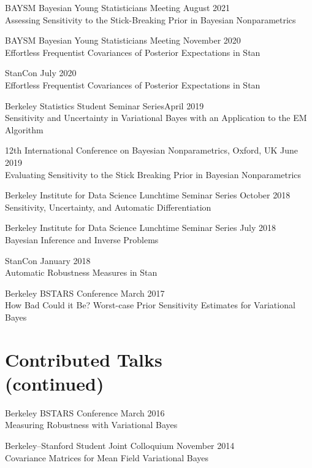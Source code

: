 \documentclass[margin,line]{res}
\begin{document}
\begin{resume}
BAYSM Bayesian Young Statisticians Meeting
\hfill August 2021\\
Assessing Sensitivity to the Stick-Breaking Prior in Bayesian Nonparametrics

BAYSM Bayesian Young Statisticians Meeting
\hfill November 2020\\
Effortless Frequentist Covariances of Posterior Expectations in Stan

StanCon \hfill July 2020\\
Effortless Frequentist Covariances of Posterior Expectations in Stan

Berkeley Statistics Student Seminar Series\hfill April 2019\\
Sensitivity and Uncertainty in Variational Bayes with an Application to the
EM Algorithm

12th International Conference on Bayesian Nonparametrics, Oxford, UK
\hfill June 2019\\
Evaluating Sensitivity to the Stick Breaking Prior in Bayesian Nonparametrics

Berkeley Institute for Data Science Lunchtime Seminar Series \hfill October 2018\\
Sensitivity, Uncertainty, and Automatic Differentiation

Berkeley Institute for Data Science Lunchtime Seminar Series \hfill July 2018\\
Bayesian Inference and Inverse Problems

StanCon \hfill January 2018\\
Automatic Robustness Measures in Stan


Berkeley BSTARS Conference \hfill March 2017\\
How Bad Could it Be?  Worst-case Prior Sensitivity Estimates for Variational Bayes

\clearpage
\section{\sc Contributed Talks\\(continued)}

Berkeley BSTARS Conference \hfill March 2016\\
Measuring Robustness with Variational Bayes

Berkeley--Stanford Student Joint Colloquium \hfill November 2014\\
Covariance Matrices for Mean Field Variational Bayes


\end{resume}
\end{document}
